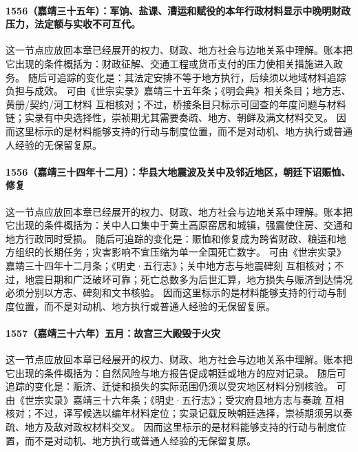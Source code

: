 \paragraph{1556（嘉靖三十五年）：军饷、盐课、漕运和赋役的本年行政材料显示中晚明财政压力，法定额与实收不可互代。} 这一节点应放回本章已经展开的权力、财政、地方社会与边地关系中理解。账本把它出现的条件概括为：财政征解、交通工程或货币支付的压力使相关措施进入政务。 随后可追踪的变化是：其法定安排不等于地方执行，后续须以地域材料追踪负担与成效。 可由《世宗实录》嘉靖三十五年条；《明会典》相关条目；地方志、黄册/契约/河工材料 互相核对；不过，桥接条目只标示可回查的年度问题与材料链；实录有中央选择性，崇祯期尤其需要奏疏、地方、朝鲜及满文材料交叉。 因而这里标示的是材料能够支持的行动与制度位置，而不是对动机、地方执行或普通人经验的无保留复原。

\paragraph{1556（嘉靖三十四年十二月）：华县大地震波及关中及邻近地区，朝廷下诏赈恤、修复} 这一节点应放回本章已经展开的权力、财政、地方社会与边地关系中理解。账本把它出现的条件概括为：关中人口集中于黄土高原窑居和城镇，强震使住房、交通和地方行政同时受损。 随后可追踪的变化是：赈恤和修复成为跨省财政、粮运和地方组织的长期任务；灾害影响不宜压缩为单一全国死亡数字。 可由《世宗实录》嘉靖三十四年十二月条；《明史·五行志》；关中地方志与地震碑刻 互相核对；不过，地震日期和广泛破坏可靠；死亡总数多为后世汇算，地方损失与赈济到达情况必须分别以方志、碑刻和文书核验。 因而这里标示的是材料能够支持的行动与制度位置，而不是对动机、地方执行或普通人经验的无保留复原。

\paragraph{1557（嘉靖三十六年）五月：故宫三大殿毁于火灾} 这一节点应放回本章已经展开的权力、财政、地方社会与边地关系中理解。账本把它出现的条件概括为：自然风险与地方报告促成朝廷或地方的应对记录。 随后可追踪的变化是：赈济、迁徙和损失的实际范围仍须以受灾地区材料分别核验。 可由《世宗实录》嘉靖三十六年条；《明史·五行志》；受灾府县地方志与奏疏 互相核对；不过，译写候选以编年材料定位；实录记载反映朝廷选择，崇祯期须另以奏疏、地方及敌对政权材料交叉。 因而这里标示的是材料能够支持的行动与制度位置，而不是对动机、地方执行或普通人经验的无保留复原。

